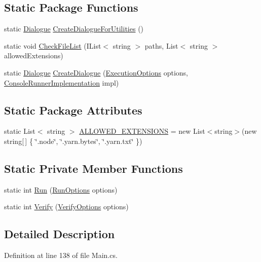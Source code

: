 \subsection*{Static Package Functions}
\begin{DoxyCompactItemize}
\item 
static \hyperlink{a00088}{Dialogue} \hyperlink{a00172_aff69d6e16dddb077f87a616a57cd3c66}{Create\-Dialogue\-For\-Utilities} ()
\item 
static void \hyperlink{a00172_ad77564b25725a771f0fd4da430582e6f}{Check\-File\-List} (I\-List$<$ string $>$ paths, List$<$ string $>$ allowed\-Extensions)
\item 
static \hyperlink{a00088}{Dialogue} \hyperlink{a00172_aab244361a510cee18ad2f636d110e0d5}{Create\-Dialogue} (\hyperlink{a00099}{Execution\-Options} options, \hyperlink{a00053}{Console\-Runner\-Implementation} impl)
\end{DoxyCompactItemize}
\subsection*{Static Package Attributes}
\begin{DoxyCompactItemize}
\item 
static List$<$ string $>$ \hyperlink{a00172_a0979de7ea02c8c0375b8220a12e6575e}{A\-L\-L\-O\-W\-E\-D\-\_\-\-E\-X\-T\-E\-N\-S\-I\-O\-N\-S} = new List$<$string$>$(new string\mbox{[}$\,$\mbox{]} \{ \char`\"{}.node\char`\"{}, \char`\"{}.yarn.\-bytes\char`\"{}, \char`\"{}.yarn.\-txt\char`\"{} \})
\end{DoxyCompactItemize}
\subsection*{Static Private Member Functions}
\begin{DoxyCompactItemize}
\item 
static int \hyperlink{a00172_a1b974c55540795a9e643c2ec055fbd51}{Run} (\hyperlink{a00142}{Run\-Options} options)
\item 
static int \hyperlink{a00172_a029a5624e7cc3a16ae586b64f13049de}{Verify} (\hyperlink{a00169}{Verify\-Options} options)
\end{DoxyCompactItemize}


\subsection{Detailed Description}


Definition at line 138 of file Main.\-cs.



